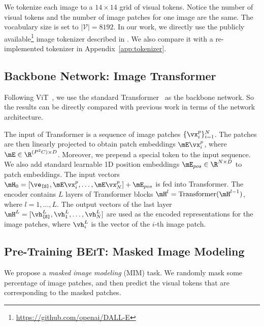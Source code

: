 \documentclass{article}
\newcommand\our{\textsc{BEiT}}
\begin{document}
We tokenize each image to a $14\times 14$ grid of visual tokens.
Notice the number of visual tokens and the number of image patches for one image are the same.
The vocabulary size is set to $|\mathcal{V}|=8192$.
In our work, we directly use the publicly available\footnote{\url{https://github.com/openai/DALL-E}} image tokenizer described in \citep{dalle}.
We also compare it with a re-implemented tokenizer in Appendix~\ref{app:tokenizer}.


\subsection{Backbone Network: Image Transformer}
\label{sec:backbone}

Following ViT~\citep{vit}, we use the standard Transformer~\citep{transformer} as the backbone network.
So the results can be directly compared with previous work in terms of the network architecture.

The input of Transformer is a sequence of image patches $\{ \vx^{p}_{i} \}_{i=1}^{N}$.
The patches are then linearly projected to obtain patch embeddings $\mE \vx^{p}_{i}$, where $\mE \in \R^{(P^2 C) \times D}$.
Moreover, we prepend a special token  to the input sequence.
We also add standard learnable 1D position embeddings $\mE_{pos} \in \R^{N \times D}$ to patch embeddings.
The input vectors $\mH_0 = [ \ve_{\sptk{S}} , \mE \vx^{p}_{i} , \dots , \mE \vx^{p}_{N} ] + \mE_{pos}$ is fed into Transformer.
The encoder contains $L$ layers of Transformer blocks $\mH^l = \mathrm{Transformer}( \mH^{l-1} )$, where $l=1, \dots, L$.
The output vectors of the last layer $\mH^{L} = [ \vh^{L}_{\sptk{S}}, \vh^{L}_{1}, \dots, \vh^{L}_{N} ]$ are used as the encoded representations for the image patches, where $\vh^{L}_{i}$ is the vector of the $i$-th image patch.

\subsection{Pre-Training \our{}: Masked Image Modeling}

We propose a \textit{masked image modeling} (MIM) task.
We randomly mask some percentage of image patches, and then predict the visual tokens that are corresponding to the masked patches.
\end{document}
